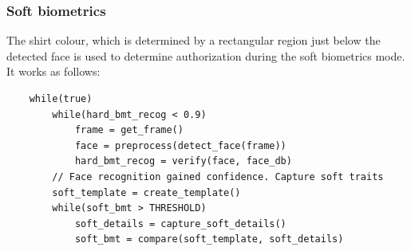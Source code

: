 \documentclass[12pt]{article}			%
\begin{document}
\subsubsection{ Soft biometrics }
The shirt colour, which is determined by a rectangular region just below the detected face is used to determine authorization during the soft biometrics mode. It works as follows:\\[2ex]
\begin{verbatim}
    while(true)
        while(hard_bmt_recog < 0.9)
            frame = get_frame()
            face = preprocess(detect_face(frame))
            hard_bmt_recog = verify(face, face_db)
        // Face recognition gained confidence. Capture soft traits
        soft_template = create_template()
        while(soft_bmt > THRESHOLD)
            soft_details = capture_soft_details()
            soft_bmt = compare(soft_template, soft_details)
\end{verbatim}
\end{document}
